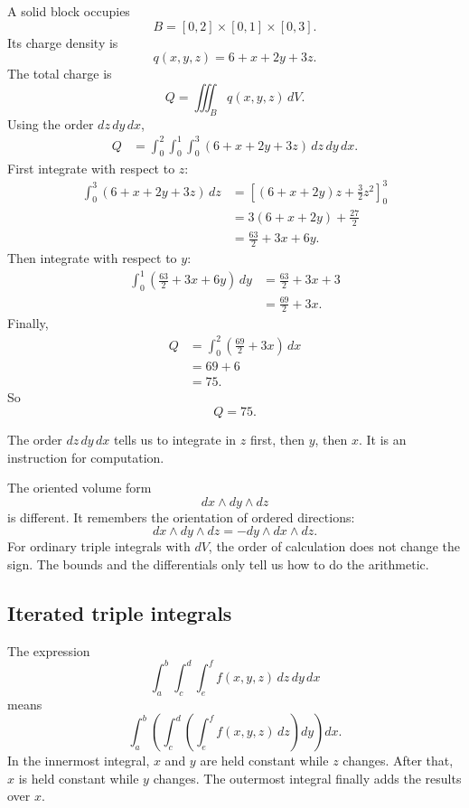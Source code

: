 \begin{example}
A solid block occupies
\[
    B=[0,2]\times[0,1]\times[0,3].
\]
Its charge density is
\[
    q(x,y,z)=6+x+2y+3z.
\]
The total charge is
\[
    Q=\iiint_B q(x,y,z)\,dV.
\]
Using the order \(dz\,dy\,dx\),
\[
\begin{aligned}
Q
&=
\int_0^2\int_0^1\int_0^3
(6+x+2y+3z)\,dz\,dy\,dx.
\end{aligned}
\]
First integrate with respect to \(z\):
\[
\begin{aligned}
\int_0^3(6+x+2y+3z)\,dz
&=
\left[(6+x+2y)z+\frac32z^2\right]_0^3\\
&=
3(6+x+2y)+\frac{27}{2}\\
&=
\frac{63}{2}+3x+6y.
\end{aligned}
\]
Then integrate with respect to \(y\):
\[
\begin{aligned}
\int_0^1
\left(
\frac{63}{2}+3x+6y
\right)\,dy
&=
\frac{63}{2}+3x+3\\
&=
\frac{69}{2}+3x.
\end{aligned}
\]
Finally,
\[
\begin{aligned}
Q
&=
\int_0^2
\left(
\frac{69}{2}+3x
\right)\,dx\\
&=
69+6\\
&=
75.
\end{aligned}
\]
So
\[
\boxed{
    Q=75.
}
\]
\end{example}

The order \(dz\,dy\,dx\) tells us to integrate in \(z\) first, then \(y\), then \(x\).
It is an instruction for computation.

The oriented volume form
\[
    dx\wedge dy\wedge dz
\]
is different.  It remembers the orientation of ordered directions:
\[
    dx\wedge dy\wedge dz
    =
    -dy\wedge dx\wedge dz.
\]
For ordinary triple integrals with \(dV\), the order of calculation does not change the
sign.  The bounds and the differentials only tell us how to do the arithmetic.

\subsection{Iterated triple integrals}

The expression
\[
    \int_a^b\int_c^d\int_e^f f(x,y,z)\,dz\,dy\,dx
\]
means
\[
    \int_a^b
    \left(
        \int_c^d
        \left(
            \int_e^f f(x,y,z)\,dz
        \right)
        dy
    \right)
    dx.
\]
In the innermost integral, \(x\) and \(y\) are held constant while \(z\) changes.  After
that, \(x\) is held constant while \(y\) changes.  The outermost integral finally adds the
results over \(x\).

